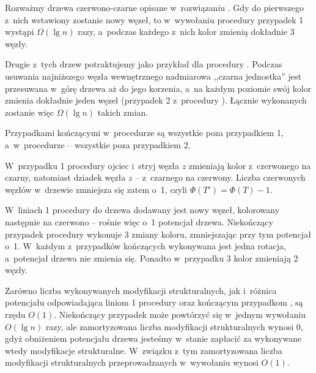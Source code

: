 
\subproblem %
Rozważmy drzewa czerwono-czarne opisane w~rozwiązaniu .
Gdy do pierwszego z~nich wstawiony zostanie nowy węzeł, to w~wywołaniu procedury  przypadek 1 wystąpi $\Omega(\lg n)$ razy, a~podczas każdego z~nich kolor zmienią dokładnie 3 węzły.

Drugie z~tych drzew potraktujemy jako przykład dla procedury .
Podczas usuwania najniższego węzła wewnętrznego nadmiarowa ,,czarna jednostka'' jest przesuwana w~górę drzewa aż do jego korzenia, a~na każdym poziomie swój kolor zmienia dokładnie jeden węzeł (przypadek 2 z~procedury ).
Łącznie wykonanych zostanie więc $\Omega(\lg n)$ takich zmian.

\subproblem %
Przypadkami kończącymi w~procedurze  są wszystkie poza przypadkiem 1, a~w~procedurze  -- wszystkie poza przypadkiem 2.

\subproblem %
W~przypadku 1 procedury  ojciec i~stryj węzła $z$ zmieniają kolor z~czerwonego na czarny, natomiast dziadek węzła $z$ -- z~czarnego na czerwony.
Liczba czerwonych węzłów w~drzewie zmniejsza się zatem o~1, czyli $\Phi(T')=\Phi(T)-1$.

\subproblem %
W~liniach 1 procedury  do drzewa dodawany jest nowy węzeł, kolorowany następnie na czerwono -- rośnie więc o~1 potencjał drzewa.
Niekończący przypadek procedury  wykonuje 3 zmiany koloru, zmniejszając przy tym potencjał o~1.
W~każdym z~przypadków kończących wykonywana jest jedna rotacja, a~potencjał drzewa nie zmienia się.
Ponadto w~przypadku 3 kolor zmieniają 2 węzły.

\subproblem %
Zarówno liczba wykonywanych modyfikacji strukturalnych, jak i~różnica potencjału odpowiadająca liniom 1 procedury  oraz kończącym przypadkom , są rzędu $O(1)$.
Niekończący przypadek  może powtórzyć się w~jednym wywołaniu $O(\lg n)$ razy, ale zamortyzowana liczba modyfikacji strukturalnych wynosi 0, gdyż obniżeniem potencjału drzewa jesteśmy w~stanie zapłacić za wykonywane wtedy modyfikacje strukturalne.
W~związku z~tym zamortyzowana liczba modyfikacji strukturalnych przeprowadzanych w~wywołaniu  wynosi $O(1)$.


